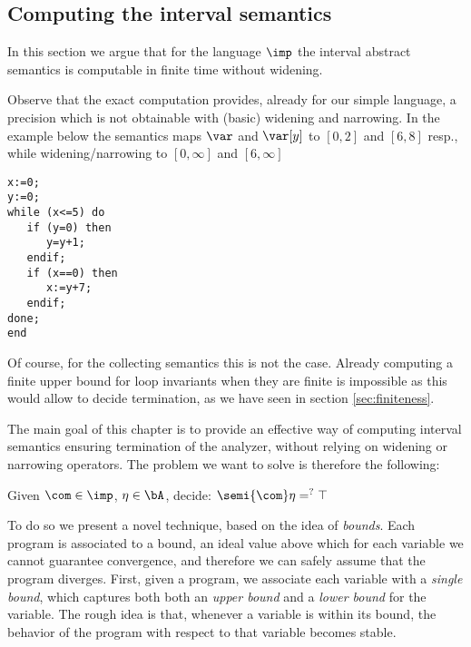 \subsection{Computing the interval semantics} \label{sub:computingint}

In this section we argue that for the language \(\imp\) the interval
abstract semantics is computable in finite time without widening.

Observe that the exact computation provides, already for our simple
language, a precision which is not obtainable with (basic) widening
and narrowing. In the example below the semantics maps \(\var\) and
\(\var[y]\) to \([0,2]\) and \([6,8]\) resp., while widening/narrowing
to \([0,\infty]\) and \([6,\infty]\)

\begin{verbatim}
x:=0;
y:=0;
while (x<=5) do
   if (y=0) then
      y=y+1;
   endif;
   if (x==0) then
      x:=y+7;
   endif;
done;
end
\end{verbatim}

Of course, for the collecting semantics this is not the case. Already
computing a finite upper bound for loop invariants when they are
finite is impossible as this would allow to decide termination, as we
have seen in section \ref{sec:finiteness}.

The main goal of this chapter is to provide an effective way of
computing interval semantics ensuring termination of the analyzer,
without relying on widening or narrowing operators. The problem we
want to solve is therefore the following:

\begin{problem}\label{problem1}
  Given \(\com\in \imp\), \(\eta \in \bA\), decide: \(\semi{\com} \eta
  =^? \top\)
\end{problem}

To do so we present a novel technique, based on the idea of
\emph{bounds}. Each program is associated to a bound, an ideal value
above which for each variable we cannot guarantee convergence, and
therefore we can safely assume that the program diverges.  First,
given a program, we associate each variable with a \emph{single
  bound}, which captures both both an \emph{upper bound} and a
\emph{lower bound} for the variable. The rough idea is that, whenever
a variable is within its bound, the behavior of the program with
respect to that variable becomes stable. %

